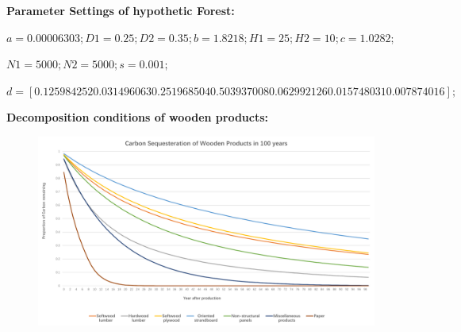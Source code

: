 \documentclass{mcmthesis}
\numberwithin{figure}{section}
\numberwithin{table}{section}
\numberwithin{equation}{section}
\begin{document}
\lhead{\small\sffamily \team}

\newpage

\begin{appendices}

\textbf{Parameter Settings of hypothetic Forest:}

$ a=0.00006303;
D1=0.25;
D2=0.35;
b=1.8218;
H1=25;
H2=10;
c=1.0282;$

$
N1=5000;
N2=5000;
s=0.001;%
$

$
d=[0.125984252 0.031496063 0.251968504 0.503937008 0.062992126 0.015748031 
0.007874016];
 $ 
 \par

 \textbf{Decomposition conditions of wooden products:}
\begin{figure}[htbp]
  \centering
  \includegraphics[width = 14cm]{code&pic/产品腐败数据.pdf}
\end{figure}


\end{appendices}
\end{document}
